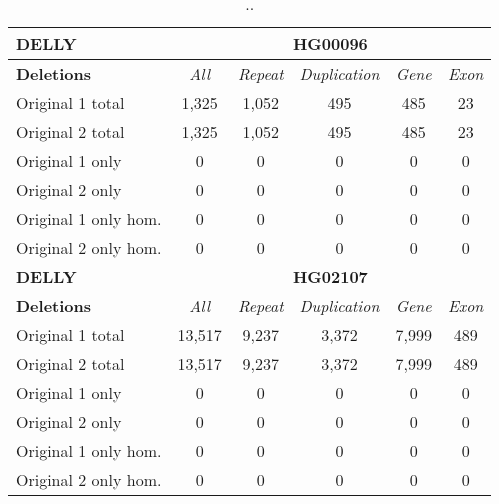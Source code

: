 \begin{table}[htb]
\caption{ .. }
\begin{center}
\begin{tabular}{|l|c||c|c|c|c|}
\hline
{\bf DELLY} & \multicolumn{5}{|c|}{\bf HG00096} \\
\hline
\cline{2-6}
{\bf Deletions} & {\it All} & {\it Repeat} & {\it Duplication} & {\it Gene} & {\it Exon} \\
\hline
Original 1 total & 1,325 & 1,052 & 495 & 485 & 23\\ 
\hline
Original 2 total & 1,325 & 1,052 & 495 & 485 & 23\\ 
\hline
Original 1 only & 0 & 0 & 0 & 0 & 0\\ 
\hline
Original 2 only & 0 & 0 & 0 & 0 & 0\\ 
\hline
Original 1 only hom. & 0 & 0 & 0 & 0 & 0\\ 
\hline
Original 2 only hom. & 0 & 0 & 0 & 0 & 0\\ 
\hline
\hline
{\bf DELLY} & \multicolumn{5}{|c|}{\bf HG02107} \\
\hline
\cline{2-6}
{\bf Deletions} & {\it All} & {\it Repeat} & {\it Duplication} & {\it Gene} & {\it Exon} \\
\hline
Original 1 total & 13,517 & 9,237 & 3,372 & 7,999 & 489\\ 
\hline
Original 2 total & 13,517 & 9,237 & 3,372 & 7,999 & 489\\ 
\hline
Original 1 only & 0 & 0 & 0 & 0 & 0\\ 
\hline
Original 2 only & 0 & 0 & 0 & 0 & 0\\ 
\hline
Original 1 only hom. & 0 & 0 & 0 & 0 & 0\\ 
\hline
Original 2 only hom. & 0 & 0 & 0 & 0 & 0\\ 
\hline
\end{tabular}
\end{center}
\label{tab:orig-vs-orig2-delly-deletions}
\end{table}

